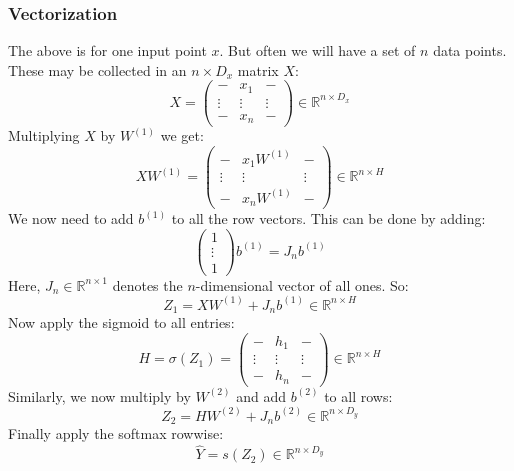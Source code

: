 \documentclass[12pt, a4paper]{article}
\numberwithin{equation}{section}
\begin{document}
\subsubsection{Vectorization}
The above is for one input point $x$. But often we will have a set of $n$ data points. These may be collected in an $n\times D_x$ matrix $X$:
\begin{equation}
X=
\begin{pmatrix}
- & x_1 & - \\
\vdots & \vdots & \vdots \\
- & x_n & -
\end{pmatrix}
\in\mathbb{R}^{n\times D_x}
\end{equation}
Multiplying $X$ by $W^{(1)}$ we get:
\begin{equation}
XW^{(1)}=
\begin{pmatrix}
- & x_1W^{(1)} & - \\
\vdots & \vdots & \vdots \\
- & x_nW^{(1)} & -
\end{pmatrix}
\in\mathbb{R}^{n\times H}
\end{equation}
We now need to add $b^{(1)}$ to all the row vectors. This can be done by adding:
\begin{equation}
\begin{pmatrix}
1 \\ \vdots \\ 1
\end{pmatrix}b^{(1)}=J_n b^{(1)}
\end{equation}
Here, $J_n\in\mathbb{R}^{n\times 1}$ denotes the $n$-dimensional vector of all ones. So:
\begin{equation}
Z_1=XW^{(1)}+J_n b^{(1)}\in\mathbb{R}^{n\times H}
\end{equation}
Now apply the sigmoid to all entries:
\begin{equation}
H=\sigma(Z_1)=
\begin{pmatrix}
- & h_1 & - \\
\vdots & \vdots & \vdots \\
- & h_n & -
\end{pmatrix}
\in\mathbb{R}^{n\times H}
\end{equation}
Similarly, we now multiply by $W^{(2)}$ and add $b^{(2)}$ to all rows:
\begin{equation}
Z_2=HW^{(2)}+J_n b^{(2)}\in\mathbb{R}^{n\times D_y}
\end{equation}
Finally apply the softmax rowwise:
\begin{equation}
\hat{Y}=s(Z_2)\in\mathbb{R}^{n\times D_y}
\end{equation}
\end{document}
